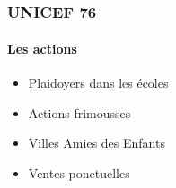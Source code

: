 \subsection{} %

\begin{frame}
\frametitle{UNICEF 76}
\framesubtitle{Les actions}
	\begin{itemize}
		\item Plaidoyers dans les \'ecoles
		\item Actions frimousses
		\item Villes Amies des Enfants
		\item Ventes ponctuelles
	\end{itemize}
\end{frame}